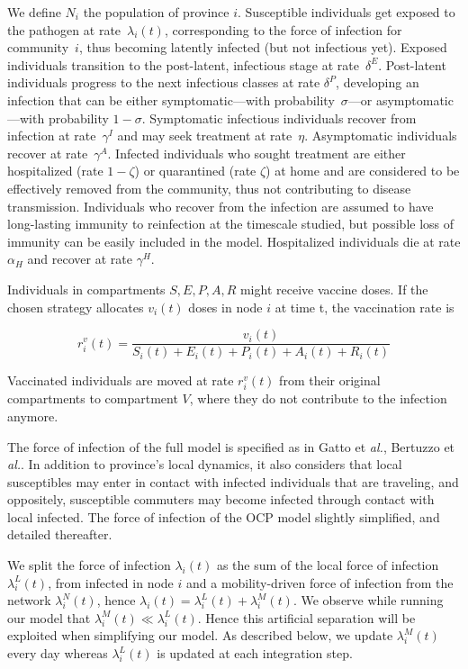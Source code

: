 We define $N_i$ the population of province $i$. Susceptible individuals get exposed to the pathogen at rate~$\lambda_i(t)$, corresponding to the force of infection for community~$i$, thus becoming latently infected (but not infectious yet). Exposed individuals transition to the post-latent, infectious stage at rate~$\delta^E$. Post-latent individuals progress to the next infectious classes at rate $\delta^P$, developing an infection that can be either symptomatic---with probability~$\sigma$---or asymptomatic---with probability $1 - \sigma$. Symptomatic infectious individuals recover from infection at rate~$\gamma^I$ and may seek treatment at rate~$\eta$. Asymptomatic individuals recover at rate~$\gamma^A$.  Infected individuals who sought treatment are either hospitalized (rate $1-\zeta$) or quarantined (rate $\zeta$) at home and are considered to be effectively removed from the community, thus not contributing to disease transmission. Individuals who recover from the infection are assumed to have long-lasting immunity to reinfection at the timescale studied, but possible loss of immunity can be easily included in the model. Hospitalized individuals die at rate $\alpha_H$ and recover at rate $\gamma^H$.

Individuals in compartments $S, E, P, A, R$ might receive vaccine doses. If the chosen strategy allocates $v_{i}(t)$ doses in node $i$ at time t, the vaccination rate is

\begin{equation}
r^v_i(t) = \frac{v_{i}(t)}{S_i(t) +  E_i(t) + P_i(t) + A_i(t) + R_i(t)}
\end{equation}

Vaccinated individuals are moved at rate $r^v_i(t)$ from their original compartments to compartment $V$, where they do not contribute to the infection anymore.

The force of infection of the full model is specified as in Gatto et \textit{al.}\cite{Gatto:SpreadDynamicsCOVID19:2020}, Bertuzzo et \textit{al.}\cite{Bertuzzo:GeographyCOVID19Spread:2020}. In addition to province's local dynamics, it also considers that local susceptibles may enter in contact with infected individuals that are traveling, and oppositely, susceptible commuters may become infected through contact with local infected. The force of infection of the OCP model slightly simplified, and detailed thereafter.

We split the force of infection $\lambda_i(t)$ as the sum of the local force of infection $\lambda^L_i(t)$, from infected in node $i$ and a mobility-driven force of infection from the network $\lambda^N_i(t)$, hence $\lambda_i(t) = \lambda^L_i(t) + \lambda^M_i(t)$. We observe while running our model that $\lambda^M_i(t) \ll \lambda^L_i(t)$. Hence this artificial separation will be exploited when simplifying our model. As described below, we update $\lambda^M_i(t)$ every day whereas $\lambda^L_i(t)$ is updated at each integration step.

